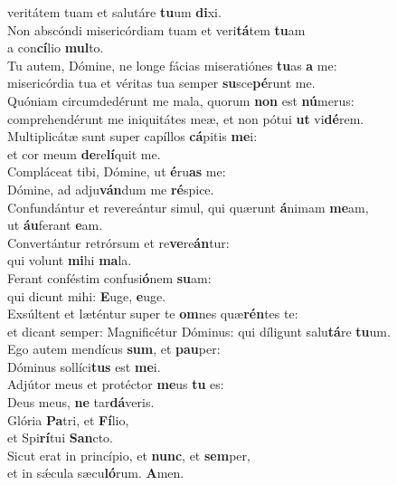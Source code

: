 \oddverse veritátem tuam et salutáre \textbf{tu}um \textbf{di}xi.\\
\evenverse Non abscóndi misericórdiam tuam et veri\textbf{tá}tem \textbf{tu}am~\*\\
\evenverse a con\textbf{cí}lio \textbf{mul}to.\\
\oddverse Tu autem, Dómine, ne longe fácias miseratiónes \textbf{tu}as \textbf{a} me:~\*\\
\oddverse misericórdia tua et véritas tua semper \textbf{su}sce\textbf{pé}runt me.\\
\evenverse Quóniam circumdedérunt me mala, quorum \textbf{non} est \textbf{nú}merus:~\*\\
\evenverse comprehendérunt me iniquitátes meæ, et non pótui \textbf{ut} vi\textbf{dé}rem.\\
\oddverse Multiplicátæ sunt super capíllos \textbf{cá}pitis \textbf{me}i:~\*\\
\oddverse et cor meum \textbf{de}re\textbf{lí}quit me.\\
\evenverse Compláceat tibi, Dómine, ut \textbf{é}ru\textbf{as} me:~\*\\
\evenverse Dómine, ad adju\textbf{ván}dum me \textbf{ré}spice.\\
\oddverse Confundántur et revereántur simul, qui quærunt \textbf{á}nimam \textbf{me}am,~\*\\
\oddverse ut \textbf{áu}ferant \textbf{e}am.\\
\evenverse Convertántur retrórsum et re\textbf{ve}re\textbf{án}tur:~\*\\
\evenverse qui volunt \textbf{mi}hi \textbf{ma}la.\\
\oddverse Ferant conféstim confusi\textbf{ó}nem \textbf{su}am:~\*\\
\oddverse qui dicunt mihi: \textbf{E}uge, \textbf{e}uge.\\
\evenverse Exsúltent et læténtur super te \textbf{om}nes quæ\textbf{rén}tes te:~\*\\
\evenverse et dicant semper: Magnificétur Dóminus: qui díligunt salu\textbf{tá}re \textbf{tu}um.\\
\oddverse Ego autem mendícus \textbf{sum}, et \textbf{pau}per:~\*\\
\oddverse Dóminus sollíci\textbf{tus} est \textbf{me}i.\\
\evenverse Adjútor meus et protéctor \textbf{me}us \textbf{tu} es:~\*\\
\evenverse Deus meus, \textbf{ne} tar\textbf{dá}veris.\\
\oddverse Glória \textbf{Pa}tri, et \textbf{Fí}lio,~\*\\
\oddverse et Spi\textbf{rí}tui \textbf{San}cto.\\
\evenverse Sicut erat in princípio, et \textbf{nunc}, et \textbf{sem}per,~\*\\
\evenverse et in sǽcula sæcu\textbf{ló}rum. \textbf{A}men.\\
